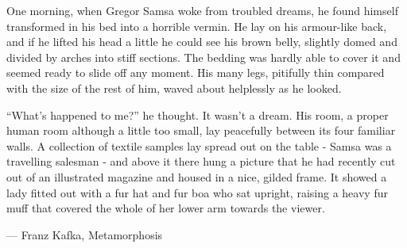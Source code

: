 \documentclass{article}
\begin{document}
  One morning, when Gregor Samsa woke from troubled dreams, he found himself
  transformed in his bed into a horrible vermin. He lay on his armour-like back,
  and if he lifted his head a little he could see his brown belly, slightly
  domed and divided by arches into stiff sections. The bedding was hardly able
  to cover it and seemed ready to slide off any moment. His many legs, pitifully
  thin compared with the size of the rest of him, waved about helplessly as he
  looked.

  ``What's happened to me?'' he thought. It wasn't a dream. His room, a proper
  human room although a little too small, lay peacefully between its four
  familiar walls. A collection of textile samples lay spread out on the table -
  Samsa was a travelling salesman - and above it there hung a picture that he
  had recently cut out of an illustrated magazine and housed in a nice, gilded
  frame. It showed a lady fitted out with a fur hat and fur boa who sat upright,
  raising a heavy fur muff that covered the whole of her lower arm towards the
  viewer.

  --- Franz Kafka, Metamorphosis
\end{document}
